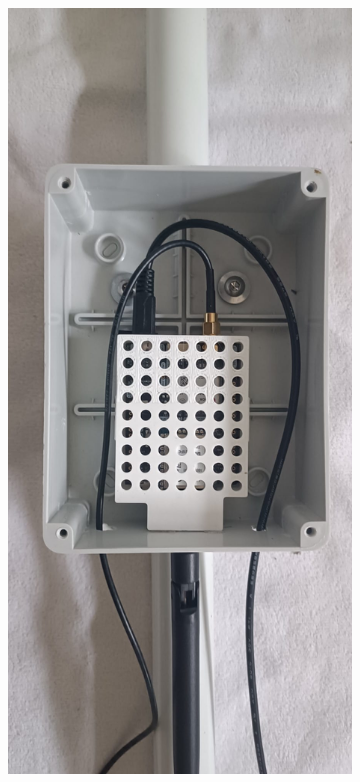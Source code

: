 \begin{figure}[H]
    \centering
    \begin{subfigure}{0.35\linewidth}
        \centering
        \includegraphics[height=0.35\textheight]{figures/base_box.png}

\end{subfigure}
\end{figure}
